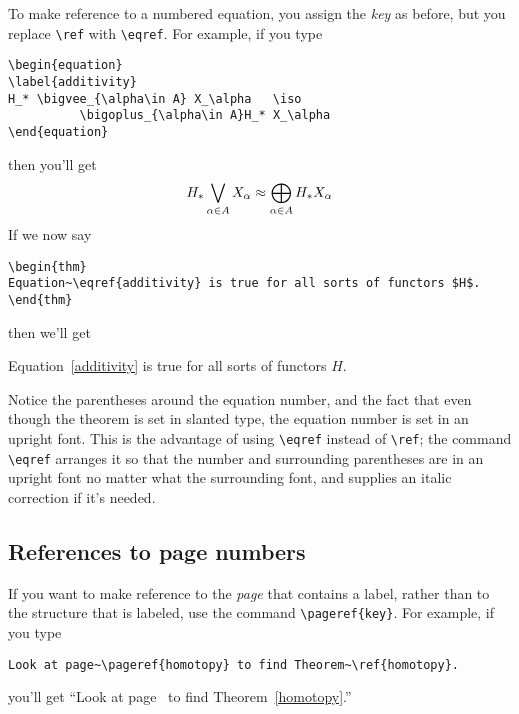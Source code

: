 To make reference to a numbered equation, you assign the {\em key\/}
as before, but you replace \verb"\ref" with \verb"\eqref".  For
example, if you type
%
\begin{verbatim}
\begin{equation}
\label{additivity}
H_* \bigvee_{\alpha\in A} X_\alpha   \iso
          \bigoplus_{\alpha\in A}H_* X_\alpha
\end{equation}
\end{verbatim}
%
then you'll get
%
\begin{equation}
\label{additivity}
H_* \bigvee_{\alpha\in A} X_\alpha   \approx
          \bigoplus_{\alpha\in A}H_* X_\alpha
\end{equation}
%
If we now say
%
\begin{verbatim}
\begin{thm}
Equation~\eqref{additivity} is true for all sorts of functors $H$.
\end{thm}
\end{verbatim}
%
then we'll get
%
\begin{thm}
Equation~\eqref{additivity} is true for all sorts of functors $H$.
\end{thm}
Notice the parentheses around the equation number, and the fact that
even though the theorem is set in slanted type, the equation
number is set in an upright font.  This is the advantage of using
\verb"\eqref" instead of \verb"\ref"; the command \verb"\eqref"
arranges it so that the number and surrounding parentheses are in an
upright font no matter what the surrounding font, and supplies an
italic correction if it's needed.


\subsection{References to page numbers}

If you want to make reference to the {\em page\/} that contains a
label, rather than to the structure that is labeled, use the command
\verb"\pageref{key}".  For example, if you type
%
\begin{verbatim}
Look at page~\pageref{homotopy} to find Theorem~\ref{homotopy}.
\end{verbatim}
%
you'll get ``Look at page~\pageref{homotopy} to find
Theorem~\ref{homotopy}.''







